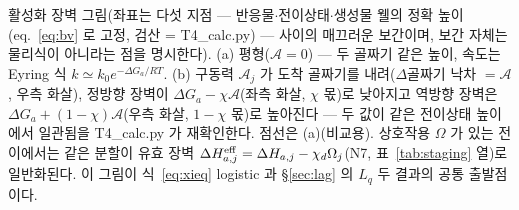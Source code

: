 \caption{활성화 장벽 그림(좌표는 다섯 지점 — 반응물$\cdot$전이상태$\cdot$생성물 웰의 정확 높이(eq.~\eqref{eq:bv}
로 고정, 검산 = T4\_calc.py) — 사이의 매끄러운 보간이며, 보간 자체는 물리식이 아니라는 점을 명시한다). (a)
평형($\mathcal A=0$) — 두 골짜기 같은 높이, 속도는 Eyring 식 $k\simeq k_0e^{-\Delta G_a/RT}$. (b) 구동력
$\mathcal A_j$ 가 도착 골짜기를 내려($\Delta$골짜기 낙차 $=\mathcal A$, 우측 화살), 정방향 장벽이
$\Delta G_a-\chi\mathcal A$(좌측 화살, $\chi$ 몫)로 낮아지고 역방향 장벽은 $\Delta G_a+(1-\chi)\mathcal A$(우측
화살, $1-\chi$ 몫)로 높아진다 — 두 값이 같은 전이상태 높이에서 일관됨을 T4\_calc.py 가 재확인한다. 점선은
(a)(비교용). 상호작용 $\Omega$ 가 있는 전이에서는 같은 분할이 유효 장벽
$\Delta H_{a,j}^\eff=\Delta H_{a,j}-\chi_d\Omega_j$(N7, 표~\ref{tab:staging} 열)로 일반화된다. 이 그림이
식~\eqref{eq:xieq} logistic 과 \S\ref{sec:lag} 의 $L_q$ 두 결과의 공통 출발점이다.}
\label{fig:barrier}
